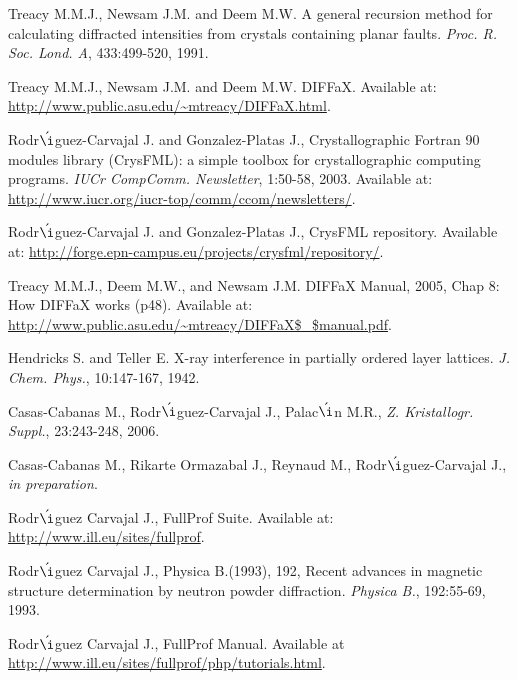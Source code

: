 


\begin{thebibliography}{99}


 Treacy M.M.J., Newsam J.M. and Deem M.W. A general recursion method for calculating diffracted intensities from crystals containing planar faults. \textit{Proc. R. Soc. Lond. A}, 433:499-520, 1991. 

 Treacy M.M.J., Newsam J.M. and Deem M.W. DIFFaX. Available at: \url{http://www.public.asu.edu/~mtreacy/DIFFaX.html}. 

 Rodr$\acute{\i}$guez-Carvajal J. and Gonzalez-Platas J., Crystallographic Fortran 90 modules library (CrysFML): a simple toolbox for crystallographic computing programs. \textit{IUCr CompComm. Newsletter}, 1:50-58, 2003. Available at: \url{http://www.iucr.org/iucr-top/comm/ccom/newsletters/}. 

 Rodr$\acute{\i}$guez-Carvajal J. and Gonzalez-Platas J., CrysFML repository. Available at: \url{http://forge.epn-campus.eu/projects/crysfml/repository/}.

 Treacy M.M.J., Deem M.W., and Newsam J.M. DIFFaX Manual, 2005, Chap 8: How DIFFaX works (p48). Available at: \url{http://www.public.asu.edu/~mtreacy/DIFFaX$\_$manual.pdf}. 

 Hendricks S. and Teller E. X-ray interference in partially ordered layer lattices. \textit{J. Chem. Phys.}, 10:147-167, 1942.

 Casas-Cabanas M., Rodr$\acute{\i}$guez-Carvajal J., Palac$\acute{\i}$n M.R., \textit{Z. Kristallogr. Suppl.}, 23:243-248, 2006. 

 Casas-Cabanas M., Rikarte Ormazabal J., Reynaud M., Rodr$\acute{\i}$guez-Carvajal J., \textit{in preparation}.

 Rodr$\acute{\i}$guez Carvajal J., FullProf Suite. Available at: \url{http://www.ill.eu/sites/fullprof}.

 Rodr$\acute{\i}$guez Carvajal J., Physica B.(1993), 192, Recent advances in magnetic structure determination by neutron powder 
diffraction. \textit{Physica B.}, 192:55-69, 1993.

 Rodr$\acute{\i}$guez Carvajal J., FullProf Manual. Available at \url{http://www.ill.eu/sites/fullprof/php/tutorials.html}.


\end{thebibliography}
